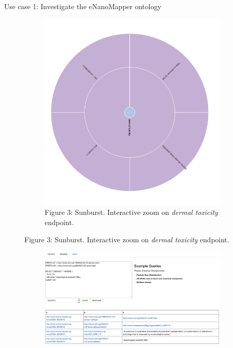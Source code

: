 \documentclass[final]{beamer}
\begin{document}
\begin{frame}{}
\begin{textblock}{62}
\begin{block}{Use case 1: Investigate the eNanoMapper ontology}
\begin{figure}
\begin{subfigure}[c]{0.35\textwidth}
            \includegraphics[scale=0.65,keepaspectratio]{onto-use-case-1b.png}
            \caption{Figure 3: Sunburst. Interactive zoom on \emph{dermal toxicity} endpoint.}
          \end{subfigure}
        \end{figure}
        \vspace{0.02\textwidth}
        \begin{figure}
          \hspace{-0.1\textwidth}
          \begin{subfigure}[c]{0.35\textwidth}
            \includegraphics[scale=0.5,keepaspectratio]{onto-use-case-1c.png}

\end{subfigure}
\end{figure}
\end{block}
\end{textblock}
\end{frame}
\end{document}
